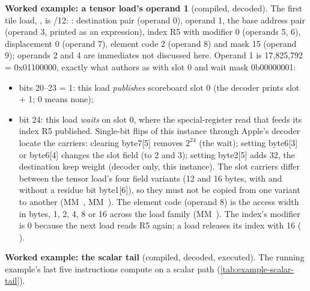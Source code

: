 \textbf{Worked example: a tensor load's operand 1} (compiled, decoded). The first tile load,
, is /12:
: destination pair (operand 0), operand 1, the base address pair
(operand 3, printed as an expression), index R5 with modifier 0 (operands 5, 6), displacement 0 (operand 7), element code
2 (operand 8) and mask 15 (operand 9); operands 2 and 4 are immediates not discussed here. Operand 1 is 17,825,792 = 0x01100000,
exactly what  authors as  with slot 0 and wait mask
0b00000001:

\begin{itemize}
\item bits 20–23 = 1: this load \emph{publishes} scoreboard slot 0 (the decoder prints slot + 1; 0 means none);
\item bit 24: this load \emph{waits} on slot 0, where the special-register read that feeds its index R5 published.
  Single-bit flips of this instance through Apple's decoder locate the carriers: clearing byte7{[}5{]} removes $2^{24}$ (the wait);
  setting byte6{[}3{]} or byte6{[}4{]} changes the slot field (to 2 and 3); setting byte2{[}5{]} adds 32, the destination keep weight
  (decoder only, this instance). The slot carriers differ between the tensor load's four field variants (12 and 16 bytes, with
  and without a residue bit byte1{[}6{]}), so they must not be copied from one variant to another (MM~, MM~). The
  element code (operand 8) is the access width in bytes, 1, 2, 4, 8 or 16 across the load family (MM~). The
  index's modifier is 0 because the next load reads R5 again; a load releases its index with 16 ( ).
\end{itemize}

\textbf{Worked example: the scalar tail} (compiled, decoded, executed). The running
example's last five instructions compute  on a scalar path (\cref{tab:example-scalar-tail}).

